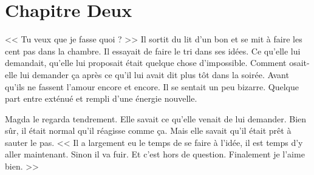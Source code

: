 \chapter[Chapitre Deux]{Chapitre Deux}
<< Tu veux que je fasse quoi ? >> Il sortit du lit d'un bon et se mit à faire les cent pas dans la chambre. Il essayait
de faire le tri dans ses idées. Ce qu'elle lui demandait, qu'elle lui proposait était quelque chose d'impossible.
Comment osait-elle lui demander ça après ce qu'il lui avait dit plus tôt dans la soirée. Avant qu'ils ne fassent l'amour
encore et encore. Il se sentait un peu bizarre. Quelque part entre exténué et rempli d'une énergie nouvelle. 

Magda le regarda tendrement. Elle savait ce qu'elle venait de lui demander. Bien sûr, il était normal qu'il réagisse
comme ça. Mais elle savait qu'il était prêt à sauter le pas. << Il a largement eu le temps de se faire à l'idée, il 
est temps d'y aller maintenant. Sinon il va fuir. Et c'est hors de question. Finalement je l'aime bien. >> 
